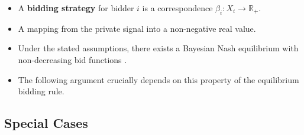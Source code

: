 \documentclass[]{book}
\providecommand{\tightlist}{%
  \setlength{\itemsep}{0pt}\setlength{\parskip}{0pt}}
\begin{document}
\begin{itemize}
\tightlist
\item
  A \textbf{bidding strategy} for bidder \(i\) is a correspondence
  \(\beta_i: X_i \to \mathbb{R}_+\).
\item
  A mapping from the private signal into a non-negative real value.
\item
  Under the stated assumptions, there exists a Bayesian Nash equilibrium
  with non-decreasing bid functions \citep{krishnaAuctionTheory2009}.
\item
  The following argument crucially depends on this property of the
  equilibrium bidding rule.
\end{itemize}

\subsection{Special Cases}\label{special-cases}
\end{document}
